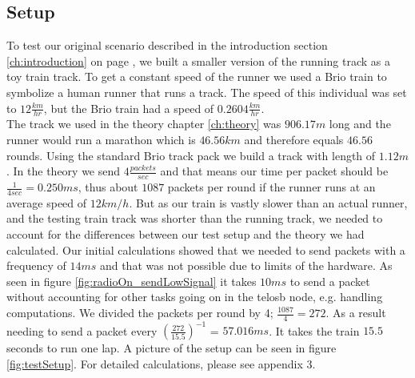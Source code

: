 \subsection{Setup}\label{sc:setup}

To test our original scenario described in the introduction section \ref{ch:introduction} on page \pageref{ch:introduction}, we built a smaller version of the running track as a toy train track. To get a constant speed of the runner we used a Brio train to symbolize a human runner that runs a track. The speed of this individual was set to $12\frac{km}{hr}$, but the Brio train had a speed of $0.2604\frac{km}{hr}$. \\

\noindent The track we used in the theory chapter \ref{ch:theory} was $906.17m$ long and the runner would run a marathon which is $46.56km$ and therefore equals $46.56$ rounds. Using the standard Brio track pack we build a track with length of $1.12m$. In the theory we send $4\frac{packets}{sec}$ and that means our time per packet should be $\frac{1}{4sec} = 0.250ms$, thus about $1087$ packets per round if the runner runs at an average speed of $12km/h$. But as our train is vastly slower than an actual runner, and the testing train track was shorter than the running track, we needed to account for the differences between our test setup and the theory we had calculated. Our initial calculations showed that we needed to send packets with a frequency of $14ms$ and that was not possible due to limits of the hardware. As seen in figure \ref{fig:radioOn_sendLowSignal} it takes $10ms$ to send a packet without accounting for other tasks going on in the telosb node, e.g. handling computations. We divided the packets per round by 4; $\frac{1087}{4} = 272$. As a result needing to send a packet every $(\frac{272}{15.5})^{-1}$ = $57.016 ms$. It takes the train $15.5$ seconds to run one lap. A picture of the setup can be seen in figure \ref{fig:testSetup}. For detailed calculations, please see appendix 3.